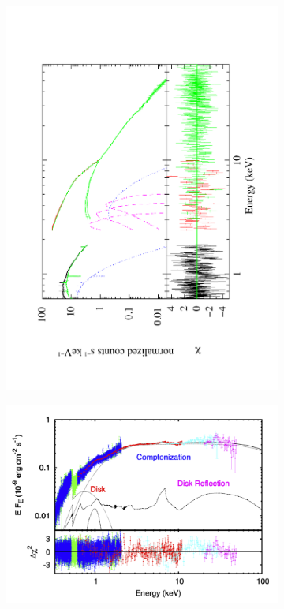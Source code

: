 \documentclass[graybox]{svmult}
\begin{document}
\begin{figure}
\begin{subfigure}{.5\textwidth}
  \centering
  \includegraphics[angle=-90,width=1.1\linewidth]{REVIEW_AMXP/nus_xmm_relxill_diskl_new}
  \label{fig:sfig1}
\end{subfigure}%
\begin{subfigure}{.5\textwidth}
  \centering
  \includegraphics[width=0.95\linewidth]{REVIEW_AMXP/hete_spec_croped.png}

\end{subfigure}
\end{figure}
\end{document}
